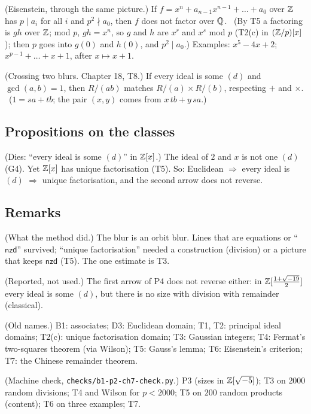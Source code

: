 \begin{lines}
\item[\lab{T6}] (Eisenstein, through the same picture.) If $f = x^n + a_{n-1}x^{n-1} + \dots + a_0$ over $\mathbb{Z}$ has $p \mid a_i$ for all $i$ and $p^2 \nmid a_0$, then $f$ does not factor over $\mathbb{Q}$. \ (By T5 a factoring is $gh$ over $\mathbb{Z}$; mod $p$, $gh = x^n$, so $g$ and $h$ are $x^r$ and $x^s$ mod $p$ (T2(c) in $(\mathbb{Z}/p)[x]$); then $p$ goes into $g(0)$ and $h(0)$, and $p^2 \mid a_0$.) Examples: $x^5 - 4x + 2$; $x^{p-1} + \dots + x + 1$, after $x \mapsto x + 1$.
\item[\lab{T7}] (Crossing two blurs. Chapter 18, T8.) If every ideal is some $(d)$ and $\gcd(a, b) = 1$, then $R/(ab)$ matches $R/(a) \times R/(b)$, respecting $+$ and $\times$. \ ($1 = sa + tb$; the pair $(x, y)$ comes from $x\,tb + y\,sa$.)
\end{lines}

\subsection*{Propositions on the classes}

\begin{lines}
\item[\lab{P4}] (Dies: ``every ideal is some $(d)$'' in $\mathbb{Z}[x]$.) The ideal of $2$ and $x$ is not one $(d)$ (G4). Yet $\mathbb{Z}[x]$ has unique factorisation (T5). So: Euclidean $\Rightarrow$ every ideal is $(d)$ $\Rightarrow$ unique factorisation, and the second arrow does not reverse.
\end{lines}

\subsection*{Remarks}

\begin{lines}
\item[\lab{R1}] (What the method did.) The blur is an orbit blur. Lines that are equations or ``$\mathsf{nzd}$'' survived; ``unique factorisation'' needed a construction (division) or a picture that keeps $\mathsf{nzd}$ (T5). The one estimate is T3.
\item[\lab{R4}] (Reported, not used.) The first arrow of P4 does not reverse either: in $\mathbb{Z}[\tfrac{1 + \sqrt{-19}}{2}]$ every ideal is some $(d)$, but there is no size with division with remainder (classical).
\item[\lab{R2}] (Old names.) B1: associates; D3: Euclidean domain; T1, T2: principal ideal domains; T2(c): unique factorisation domain; T3: Gaussian integers; T4: Fermat's two-squares theorem (via Wilson); T5: Gauss's lemma; T6: Eisenstein's criterion; T7: the Chinese remainder theorem.
\item[\lab{R3}] (Machine check, \texttt{checks/b1-p2-ch7-check.py}.) P3 (sizes in $\mathbb{Z}[\sqrt{-5}]$); T3 on $2000$ random divisions; T4 and Wilson for $p < 2000$; T5 on $200$ random products (content); T6 on three examples; T7.
\end{lines}

